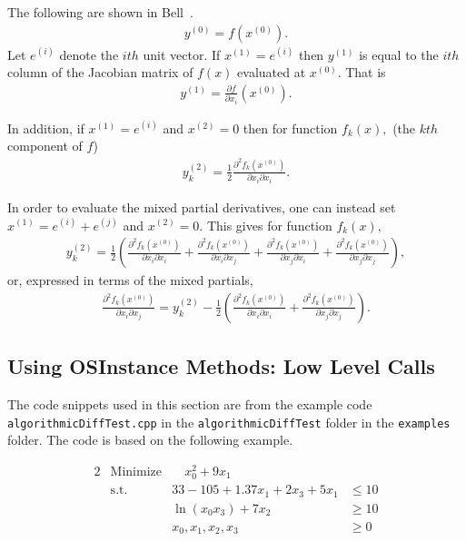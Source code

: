 \documentclass[11pt]{article}
\newcommand{\D}[2]{ \frac{\partial #1}{\partial #2} }
\newcommand{\DD}[3]{ \frac{\partial^2 #1}{\partial #2 \partial #3} }
\renewcommand{\_}{{\char"5F}}
\renewcommand{\{}{{\char"7B}}
\renewcommand{\}}{{\char"7D}}
\renewcommand{\^}{{\char"0D}}
\renewcommand{\'}{{\char"0D}}
\begin{document}
\begin{enumerate}[Step 1:]
The following are shown in Bell~\cite{bell2007}.
\begin{eqnarray}
y^{(0)} = f(x^{(0)}). \label{eq:forward0Result}
\end{eqnarray}
Let $e^{(i)}$ denote the $ith$ unit vector.  If $x^{(1)} = e^{(i)}$ then $y^{(1)}$ is equal to the $ith$ column of the Jacobian matrix of $f(x)$ evaluated at $x^{(0)}.$ That is
\begin{eqnarray}
y^{(1)} = \D{f}{x_{i}}(x^{(0)}).  \label{eq:forward1Result}
\end{eqnarray}

In addition, if $x^{(1)} = e^{(i)}$ and $x^{(2)} = 0$ then for function $f_{k}(x),$ (the $kth$ component of $f$)
\begin{eqnarray}
y^{(2)}_{k} =  \frac{1}{2} \DD{f_{k}(x^{(0)})}{x_{i}}{x_{i}}.  \label{eq:forward2Resulta}
\end{eqnarray}

In order to evaluate the mixed partial derivatives, one can instead set $x^{(1)} = e^{(i)} + e^{(j)}$ and $x^{(2)} = 0.$    This gives for function $f_{k}(x),$
\begin{eqnarray}
y^{(2)}_{k} =  \frac{1}{2} \left( \DD{f_{k}(x^{(0)})}{x_{i}}{x_{i}}  +   \DD{f_{k}(x^{(0)})}{x_{i}}{x_{j}} 
+  \DD{f_{k}(x^{(0)})}{x_{j}}{x_{i}} +  \DD{f_{k}(x^{(0)})}{x_{j}}{x_{j}}  \right), \label{eq:forward2Resultb}
\end{eqnarray}
or, expressed in terms of the mixed partials,
\begin{eqnarray}
  \DD{f_{k}(x^{(0)})}{x_{i}}{x_{j}}  = y_{k}^{(2)}  -  \frac{1}{2} \left( \DD{f_{k}(x^{(0)})}{x_{i}}{x_{i}}  
+  \DD{f_{k}(x^{(0)})}{x_{j}}{x_{j}}  \right). \label{eq:forward2Resultc}
\end{eqnarray}




\subsection{Using OSInstance Methods: Low Level Calls}\label{section:lowlevelADcalls}

  The code snippets used in this section  are from the example code {\tt algorithmicDiffTest.cpp} in the
{\tt algorithmicDiffTest} folder in the {\tt examples} folder.  The  code is based on the following example.

\begin{alignat}{2}
& \mbox{Minimize} & \quad  x_{0}^{2} + 9x_{1} \label{eq:adobj}\\
& \mbox{s.t.} & 33 - 105 + 1.37 x_{1} + 2x_{3} + 5 x_{1} &\le 10  \label{eq:adeq0}\\
& & \ln(x_{0} x_{3}) + 7x_{2} &\ge 10 \label{eq:adeq1} \\
& & x_{0}, x_{1}, x_{2}, x_{3} &\ge 0 \label{eq:adeq2}
\end{alignat}


\end{enumerate}
\end{document}
